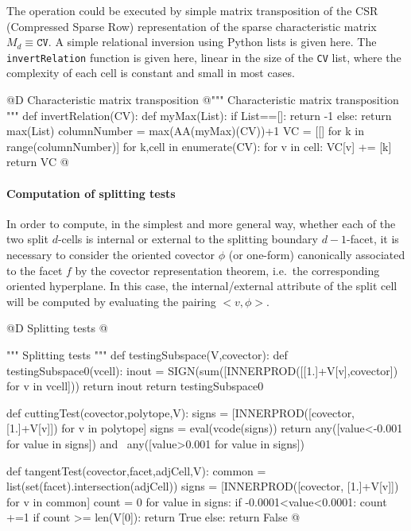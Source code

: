 \documentclass[11pt,oneside]{article}	%
\begin{document}
The operation could be executed by simple matrix transposition of the CSR (Compressed Sparse Row) representation of the sparse characteristic matrix $M_d \equiv \texttt{CV}$.
A simple relational inversion using Python lists is given here. The \texttt{invertRelation} function 
is given here, linear in the size of the \texttt{CV} list, where the complexity of each cell is constant and 
small in most cases.

@D Characteristic matrix transposition
@{""" Characteristic matrix transposition """
def invertRelation(CV):
	def myMax(List):
		if List==[]: return -1
		else: return max(List)
	columnNumber = max(AA(myMax)(CV))+1
	VC = [[] for k in range(columnNumber)]
	for k,cell in enumerate(CV):
		for v in cell:
			VC[v] += [k]
	return VC
@}


\paragraph{Computation of splitting tests}

In order to compute, in the simplest and more general way, whether each of the two split $d$-cells is internal or external to the splitting boundary $d-1$-facet, it is necessary to consider the oriented covector $\phi$ (or one-form) canonically associated to the facet $f$ by the covector representation theorem, i.e.~the corresponding oriented hyperplane. In this case, the internal/external attribute of the split cell will be computed by evaluating the pairing $<v,\phi>$.

@D Splitting tests
@{""" Splitting tests """
def testingSubspace(V,covector):
	def testingSubspace0(vcell):
		inout = SIGN(sum([INNERPROD([[1.]+V[v],covector]) for v in vcell]))
		return inout
	return testingSubspace0
	
def cuttingTest(covector,polytope,V):
	signs = [INNERPROD([covector, [1.]+V[v]]) for v in polytope]
	signs = eval(vcode(signs))
	return any([value<-0.001 for value in signs]) and \
			any([value>0.001 for value in signs])
	
def tangentTest(covector,facet,adjCell,V):
	common = list(set(facet).intersection(adjCell))
	signs = [INNERPROD([covector, [1.]+V[v]]) for v in common]
	count = 0
	for value in signs:
		if -0.0001<value<0.0001: count +=1
	if count >= len(V[0]): 
		return True
	else: 
		return False	
@}
\end{document}
